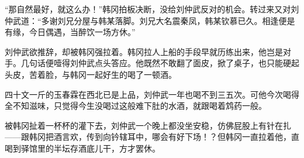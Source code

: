 “那自然最好，就这么办！”韩冈拍板决断，没给刘仲武反对的机会。转过来又对刘仲武道：“多谢刘兄分屋与韩某落脚。刘兄大名震秦凤，韩某钦慕已久。相逢便是有缘，今日偶遇，当醉饮一场方休。”

刘仲武欲推辞，却被韩冈强拉着。韩冈拉人上船的手段早就历练出来，他岂是对手。几句话便噎得刘仲武点头答应。他既然不敢翻了面皮，掀了桌子，也只能硬起头皮，苦着脸，与韩冈一起好生的喝了一顿酒。

四十文一斤的玉春霖在西北已是上品，刘仲武一年也喝不到三五次。可他今次喝得全不知滋味，只觉得今生没喝过这般难下肚的水酒，就跟喝着鸩药一般。

被韩冈扯着一杯杯的灌下去，刘仲武一个晚上都没坐安稳，仿佛屁股上有针在扎——跟韩冈把酒言欢，传到向钤辖耳中，哪会有好下场！？但韩冈一直拉着他，直喝到驿馆里的半坛存酒底儿干，方才罢休。

